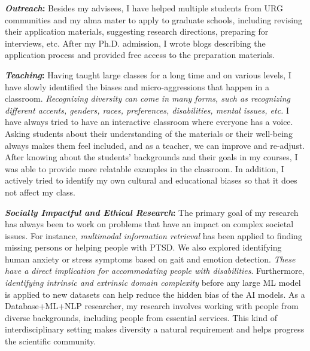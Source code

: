 \documentclass[9pt]{article}
\newcommand*\heading[1]{\textbf{\textit{#1}:}}
\begin{document}
\heading{Outreach} Besides my advisees, I have helped multiple students from URG communities and my alma mater to apply to graduate schools, including revising their application materials, suggesting research directions, preparing for interviews, etc. After my Ph.D. admission, I wrote blogs describing the application process and provided free access to the preparation materials.

\heading{Teaching}
Having taught large classes for a long time and on various levels, I have slowly identified the biases and micro-aggressions that happen in a classroom. 
\textit{Recognizing diversity can come in many forms, such as recognizing different accents, genders, races, preferences, disabilities, mental issues, etc.} I have always tried to have an interactive classroom where everyone has a voice. Asking students about their understanding of the materials or their well-being always makes them feel included, and as a teacher, we can improve and re-adjust. After knowing about the students' backgrounds and their goals in my courses, I was able to provide more relatable examples in the classroom. In addition, I actively tried to identify my own cultural and educational biases so that it does not affect my class.

\heading{Socially Impactful and Ethical Research} 
The primary goal of my research has always been to work on problems that have an impact on complex societal issues. For instance, \textit{multimodal information retrieval} has been applied to finding missing persons or helping people with PTSD. 
We also explored identifying human anxiety or stress symptoms based on gait and emotion detection. \textit{These have a direct implication for accommodating people with disabilities}. Furthermore, \textit{identifying intrinsic and extrinsic domain complexity} before any large ML model is applied to new datasets can help reduce the hidden bias of the AI models.
As a Database+ML+NLP researcher, my research involves working with people from diverse backgrounds, including people from essential services. This kind of interdisciplinary setting makes diversity a natural requirement and helps progress the scientific community. 

\medskip
\end{document}

